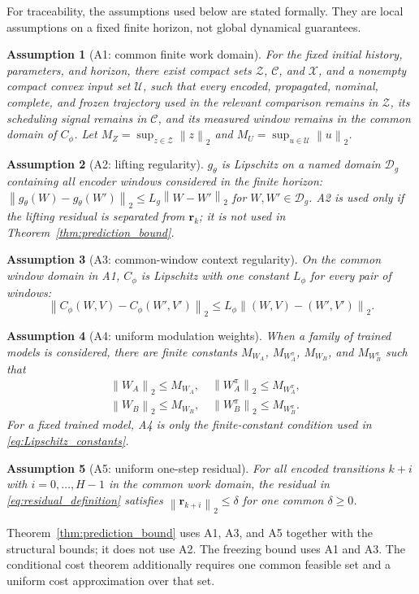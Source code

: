 ﻿\documentclass[journal]{IEEEtran}
\newtheorem{assumption}{Assumption}
\newcommand{\vr}{\mathbf{r}}
\newcommand{\norm}[1]{\left\lVert #1\right\rVert}
\begin{document}
For traceability, the assumptions used below are stated formally. They are local assumptions on a fixed finite horizon, not global dynamical guarantees.
\begin{assumption}[A1: common finite work domain]
\label{ass:a1}
For the fixed initial history, parameters, and horizon, there exist compact sets $\mathcal Z$, $\mathcal C$, and $\mathcal X$, and a nonempty compact convex input set $\mathcal U$, such that every encoded, propagated, nominal, complete, and frozen trajectory used in the relevant comparison remains in $\mathcal Z$, its scheduling signal remains in $\mathcal C$, and its measured window remains in the common domain of $C_\phi$. Let $M_Z=\sup_{z\in\mathcal Z}\norm{z}_2$ and $M_U=\sup_{u\in\mathcal U}\norm{u}_2$.
\end{assumption}
\begin{assumption}[A2: lifting regularity]
\label{ass:a2}
$g_\theta$ is Lipschitz on a named domain $\mathcal D_g$ containing all encoder windows considered in the finite horizon: $\norm{g_\theta(W)-g_\theta(W')}_2\le L_g\norm{W-W'}_2$ for $W,W'\in\mathcal D_g$. A2 is used only if the lifting residual is separated from $\vr_k$; it is not used in Theorem~\ref{thm:prediction_bound}.
\end{assumption}
\begin{assumption}[A3: common-window context regularity]
\label{ass:a3}
On the common window domain in A1, $C_\phi$ is Lipschitz with one constant $L_\phi$ for every pair of windows:
\begin{equation}
\norm{C_\phi(W,V)-C_\phi(W',V')}_2\le L_\phi\norm{(W,V)-(W',V')}_2.
\end{equation}
\end{assumption}
\begin{assumption}[A4: uniform modulation weights]
\label{ass:a4}
When a family of trained models is considered, there are finite constants $M_{W_A}$, $M_{W_A^\pi}$, $M_{W_B}$, and $M_{W_B^\pi}$ such that
\begin{equation}
\begin{gathered}
\norm{W_A}_2\le M_{W_A},\quad \norm{W_A^\pi}_2\le M_{W_A^\pi},\quad
\\
\norm{W_B}_2\le M_{W_B},\quad \norm{W_B^\pi}_2\le M_{W_B^\pi}.
\end{gathered}
\end{equation}
For a fixed trained model, A4 is only the finite-constant condition used in \eqref{eq:Lipschitz_constants}.
\end{assumption}
\begin{assumption}[A5: uniform one-step residual]
\label{ass:a5}
For all encoded transitions $k+i$ with $i=0,\ldots,H-1$ in the common work domain, the residual in \eqref{eq:residual_definition} satisfies $\norm{\vr_{k+i}}_2\le\delta$ for one common $\delta\ge0$.
\end{assumption}
Theorem~\ref{thm:prediction_bound} uses A1, A3, and A5 together with the structural bounds; it does not use A2. The freezing bound uses A1 and A3. The conditional cost theorem additionally requires one common feasible set and a uniform cost approximation over that set.
\end{document}
